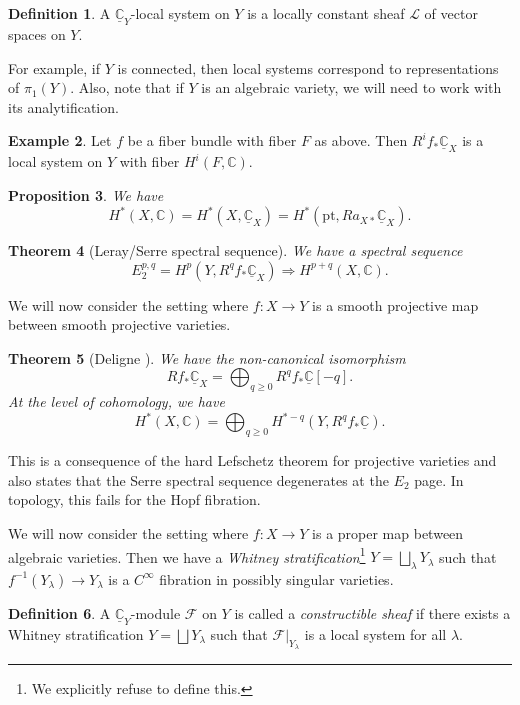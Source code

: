 \documentclass{amsart}
\newtheorem{thm}{Theorem}[section]
\newtheorem{prop}[thm]{Proposition}
\theoremstyle{definition}
\newtheorem{defn}[thm]{Definition}
\newtheorem{exm}[thm]{Example}
\theoremstyle{remark}
\theoremstyle{plain}
\theoremstyle{definition}
\theoremstyle{remark}
\newcommand{\C}{\mathbb{C}}
\newcommand{\mc}[1]{\mathcal{#1}}
\newcommand{\mr}[1]{\mathrm{#1}}
\newcommand{\ul}[1]{\underline{#1}}
\newcommand{\1}{\mathbf{1}}
\newcommand{\2}{\mathbf{2}}
\newcommand{\3}{\mathbf{3}}
\begin{document}
\begin{defn}
    A \(\ul{\C}_Y\)-local system on \(Y\) is a locally constant sheaf \(\mc{L}\) of vector spaces on \(Y\).
\end{defn}

For example, if \(Y\) is connected, then local systems correspond to representations of \(\pi_1(Y)\). Also, note that if \(Y\) is an algebraic variety, we will need to work with its analytification.

\begin{exm}
    Let \(f\) be a fiber bundle with fiber \(F\) as above. Then \(R^i f_* \ul{\C}_X\) is a local system on \(Y\) with fiber \(H^i(F, \C)\).
\end{exm}

\begin{prop}
    We have
    \[ H^*(X, \C) = H^*(X, \ul{\C}_X) = H^*(\mr{pt}, R a_{X*} \ul{\C}_X). \]
\end{prop}

\begin{thm}[Leray/Serre spectral sequence]
    We have a spectral sequence
    \[ E_2^{p,q} = H^p(Y, R^q f_* \ul{\C}_X) \Rightarrow H^{p+q}(X, \C). \]
\end{thm}

We will now consider the setting where \(f \colon X \to Y\) is a smooth projective map between smooth projective varieties.

\begin{thm}[Deligne {\cite{Deligne1968}}]
    We have the non-canonical isomorphism
    \[ R f_* \ul{\C}_X = \bigoplus_{q \geq 0} R^q f_* \ul{\C}[-q]. \]
    At the level of cohomology, we have
    \[ H^*(X, \C) = \bigoplus_{q \geq 0} H^{*-q}(Y, R^q f_* \ul{\C}). \]
\end{thm}

This is a consequence of the hard Lefschetz theorem for projective varieties and also states that the Serre spectral sequence degenerates at the \(E_2\) page. In topology, this fails for the Hopf fibration.

We will now consider the setting where \(f \colon X \to Y\) is a proper map between algebraic varieties. Then we have a \textit{Whitney stratification}\footnote{We explicitly refuse to define this.} \(Y = \bigsqcup_{\lambda} Y_{\lambda}\) such that \(f^{-1}(Y_{\lambda}) \to Y_{\lambda}\) is a \(C^{\infty}\) fibration in possibly singular varieties.

\begin{defn}
    A \(\ul{\C}_Y\)-module \(\mc{F}\) on \(Y\) is called a \textit{constructible sheaf} if there exists a Whitney stratification \(Y = \bigsqcup Y_{\lambda}\) such that \(\mc{F}|_{Y_{\lambda}}\) is a local system for all \(\lambda\).
\end{defn}
\end{document}
